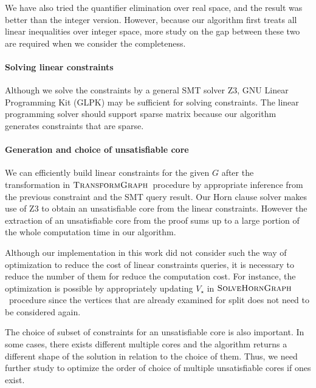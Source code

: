 We have also tried the quantifier elimination over real space, and the
result was better than the integer version.  However, because our
algorithm first treats all linear inequalities over integer space,
more study on the gap between these two are required when we consider
the completeness.


\paragraph{Solving linear constraints}
Although we solve the constraints by a general SMT solver Z3, GNU
Linear Programming Kit (GLPK) may be sufficient for solving
constraints.  The linear programming solver should support sparse
matrix because our algorithm generates constraints that are sparse.


\paragraph{Generation and choice of unsatisfiable core}
We can efficiently build linear constraints for the given $G$ after
the transformation in $\mbox{\sc TransformGraph}$~procedure by appropriate inference
from the previous constraint and the SMT query result.  Our Horn
clause solver makes use of Z3 to obtain an unsatisfiable core from the
linear constraints.  However the extraction of an unsatisfiable core
from the proof sums up to a large portion of the whole computation
time in our algorithm.

Although our implementation in this work did not consider such the way
of optimization to reduce the cost of linear constraints queries, it
is necessary to reduce the number of them for reduce the computation
cost.  For instance, the optimization is possible by appropriately
updating $V_\star$ in $\mbox{\sc SolveHornGraph}$~procedure since the vertices that
are already examined for split does not need to be considered again.

The choice of subset of constraints for an unsatisfiable core is also
important.  In some cases, there exists different multiple cores and
the algorithm returns a different shape of the solution in relation to
the choice of them.  Thus, we need further study to optimize the order
of choice of multiple unsatisfiable cores if ones exist.


